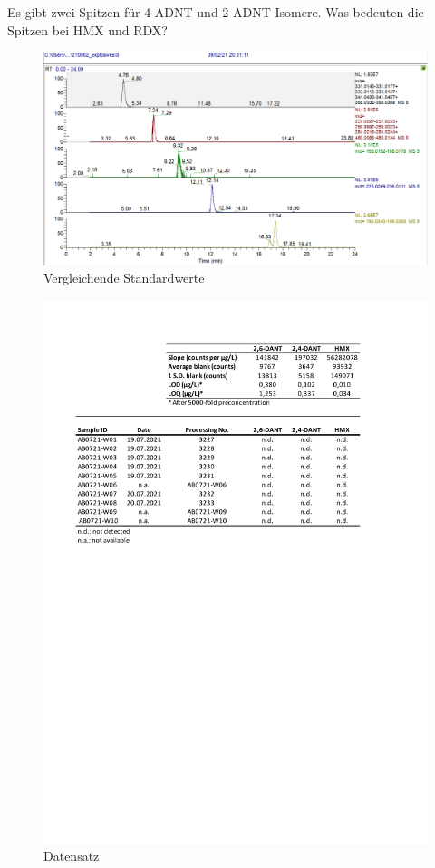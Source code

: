 Es gibt zwei Spitzen für 4-ADNT und 2-ADNT-Isomere.
Was bedeuten die Spitzen bei HMX und RDX?

\begin{figure}[htb]
\includegraphics[height=\textheight,%
                   width=\textwidth,%
                   keepaspectratio]{Bilder/Explosives_5ppb.PNG}
\caption{Vergleichende Standardwerte}
\end{figure}
\begin{figure}[htb]
\includegraphics[height=\textheight,%
                   width=\textwidth,%
                   keepaspectratio]{Bilder/MC_data_Aldebaran.pdf}
\caption{Datensatz}
\end{figure}
